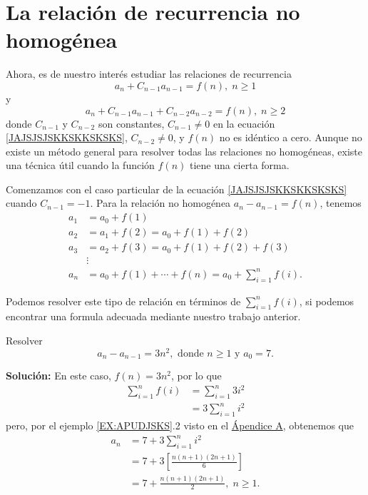 \section{La relación de recurrencia no homogénea}

Ahora, es de nuestro interés estudiar las relaciones de recurrencia
\begin{equation}
    a_n + C_{n-1}a_{n-1} = f(n), \; n \geq 1 \label{JAJSJSJSKKSKKSKSKS}
\end{equation}
y
\begin{equation}
    a_n + C_{n-1}a_{n-1} + C_{n-2}a_{n-2} = f(n), \; n \geq 2 \label{JAKAKAJAJJKKOOQIWIKJ}
\end{equation}
donde $C_{n-1}$ y $C_{n-2}$ son constantes, $C_{n-1} \neq 0$ en la ecuación \eqref{JAJSJSJSKKSKKSKSKS}, $C_{n-2} \neq 0$, y $f(n)$ no es idéntico a cero. Aunque no existe un método general para resolver todas las relaciones no homogéneas, existe una técnica útil cuando la función $f(n)$ tiene una cierta forma.

Comenzamos con el caso particular de la ecuación \eqref{JAJSJSJSKKSKKSKSKS} cuando $C_{n-1}=-1$. Para la relación no homogénea $a_n-a_{n-1}=f(n)$, tenemos
\begin{align*}
    a_1 & = a_0+f(1) \\
    a_2 & = a_1+f(2)=a_0+f(1)+f(2) \\
    a_3 & = a_2+f(3)=a_0+f(1)+f(2)+f(3) \\
    & \vdots \\
    a_n & = a_0+f(1)+\cdots+f(n)=a_0+\sum_{i=1}^n f(i) .
\end{align*}

Podemos resolver este tipo de relación en términos de $\displaystyle \sum_{i=1}^n f(i)$, si podemos encontrar una formula adecuada mediante nuestro trabajo anterior.

\begin{myexample}
    Resolver
    $$a_n - a_{n-1} = 3n^2, \text{ donde } n \geq 1 \text{ y } a_0 = 7.$$

    \tcblower
    \textbf{\color{jblueleft}Solución:} En este caso, $f(n) = 3n^2$, por lo que
    \begin{align*}
        \sum_{i=1}^n f(i) & = \sum_{i=1}^n 3i^2 \\
        & = 3 \sum_{i=1}^n i^2
    \end{align*}
    pero, por el ejemplo \ref{EX:APUDJSKS}.2 visto en el \hyperref[ch:induccion]{Ápendice A}, obtenemos que
    \begin{align*}
        a_n & = 7 + 3 \sum_{i=1}^n i^2 \\
        & = 7 + 3 \left[ \frac{n(n+1)(2n+1)}{6} \right] \\
        & = 7 + \frac{n(n+1)(2n+1)}{2}, \; n \geq 1.
    \end{align*}
\end{myexample}

